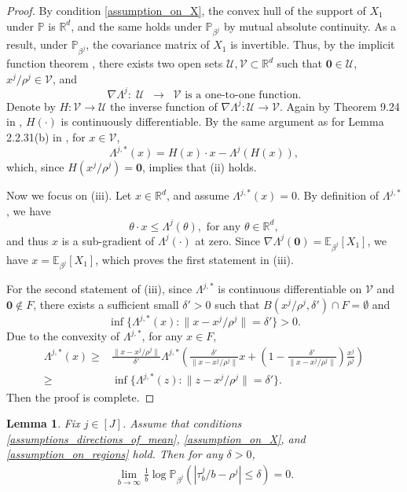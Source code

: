 \documentclass[aap,preprint]{imsart}
\newcommand{\Pro}{{\mathbb{P}}}
\newcommand{\Exp}{{\mathbb{E}}}
\newcommand{\bR}{{\mathbb{R}}}
\theoremstyle{plain}
\newtheorem{lemma}[theorem]{Lemma}
\theoremstyle{definition}
\begin{document}
\begin{appendix}
\begin{proof}
By condition \eqref{assumption_on_X}, the convex hull of the support of $X_1$ under $\Pro$ is $\mathbb{R}^d$, and the same holds under $\Pro_{\beta^j}$ by mutual absolute continuity. As a result, under $\Pro_{\beta^j}$, the covariance matrix of $X_1$ is invertible.  Thus, by the implicit function theorem \cite[Theorem 9.24]{rudin1976principles}, there exists two open sets $\mathcal{U},\mathcal{V} \subset \bR^{d}$ such that
$\mathbf{0} \in \mathcal{U}$, $x^j/\rho^j \in \mathcal{V}$, and 
$$
\nabla \Lambda^j :\; \mathcal{U} \;\; \to \;\; \mathcal{V} \text{ is a one-to-one function}.
$$
Denote by $H:\mathcal{V} \to \mathcal{U}$ the inverse function of $\nabla \Lambda^j: \mathcal{U} \to \mathcal{V}$. Again by Theorem 9.24 in \cite{rudin1976principles}, $H(\cdot)$ is continuously differentiable. By  the same argument as for Lemma 2.2.31(b) in \cite{dembo2009large}, for $x \in \mathcal{V}$,
$$
\Lambda^{j,*}(x) = H(x) \cdot x - \Lambda^j(H(x)),
$$
which, since $H(x^j/\rho^j) = \mathbf{0}$,  implies that (ii) holds.

 
Now we focus on (iii). Let $x \in \bR^d$, and assume $\Lambda^{j,*}(x) = 0$. By definition of $\Lambda^{j,*}$, we have
$$
\theta \cdot x \leq \Lambda^j(\theta), \text{ for any } \theta \in \bR^d,
$$
and thus $x$ is a sub-gradient of $\Lambda^j(\cdot)$ at zero. Since $\nabla \Lambda^{j}(\mathbf{0}) = \Exp_{\beta^j}[X_1]$, we have $x = \Exp_{\beta^j}[X_1]$, which proves the first statement in (iii).

For the second statement of (iii), since $\Lambda^{j,*}$ is continuous differentiable on $\mathcal{V}$ and $\mathbf{0} \not \in F$, there exists a sufficient small $\delta' > 0$ such that $B(x^j/\rho^j,\delta') \cap F = \emptyset$ and
$$
\inf\{\Lambda^{j,*}(x) :  \|x - x^j/\rho^j\| = \delta'  \} > 0.
$$
Due to the convexity of $\Lambda^{j,*}$, for any $x \in F$,
\begin{align*}
\Lambda^{j,*}(x) \geq &\frac{\|x-x^j/\rho^j\|}{\delta'} \Lambda^{j,*}\left(\frac{\delta'}{\|x-x^j/\rho^j\|}   x + \left(1 - \frac{\delta'}{\|x-x^j/\rho^j\|}   \right) \frac{x^j}{\rho^j}\right) \\
\geq &\inf\{\Lambda^{j,*}(z) :  \|z - x^j/\rho^j\| = \delta'  \}.
\end{align*}
Then the proof is complete.
\end{proof}

\begin{lemma}\label{lemma:aux_prob1}
    Fix $j \in [J]$. 
    Assume that conditions \eqref{assumptions_directions_of_mean}, \eqref{assumption_on_X}, and \eqref{assumption_on_regions} hold.  Then 
    for any $\delta > 0$,
        \begin{align*}
              \lim_{b \to \infty} \frac{1}{b}  \log \Pro_{\beta^j}\left(\left|{\tau_b^j}/{b} - \rho^{j}\right| \leq \delta  \right) = 0.
        \end{align*}
\end{lemma}


\end{appendix}
\end{document}
